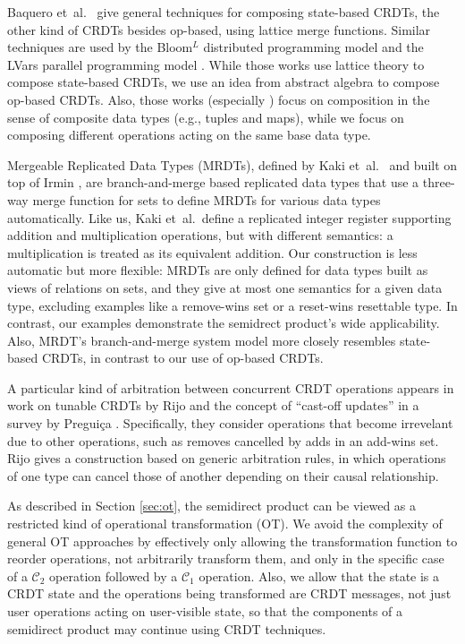 \documentclass[acmsmall,nonacm]{acmart}
\newcommand{\mc}[1]{\ensuremath{\mathcal{#1}}}
\theoremstyle{plain}
\theoremstyle{definition}
\begin{document}
Baquero et~al.\ \cite{state_based_patterns} give general techniques for composing state-based CRDTs, the other kind of CRDTs besides op-based, using lattice merge functions.  Similar techniques are used by the Bloom$\mbox{}^L$ distributed programming model \cite{bloom_lattices} and the LVars parallel programming model \cite{lvars}.  While those works use lattice theory to compose state-based CRDTs, we use an idea from abstract algebra to compose op-based CRDTs.  Also, those works (especially \cite{bloom_lattices, lvars}) focus on composition in the sense of composite data types (e.g., tuples and maps), while we focus on composing different operations acting on the same base data type.

Mergeable Replicated Data Types (MRDTs), defined by Kaki et~al.\ \cite{mrdts} and built on top of Irmin \cite{irmin}, are branch-and-merge based replicated data types that use a three-way merge function for sets to define MRDTs for various data types automatically.  Like us, Kaki et~al.\ define a replicated integer register supporting addition and multiplication operations, but with different semantics: a multiplication is treated as its equivalent addition.  Our construction is less automatic but more flexible: MRDTs are only defined for data types built as views of relations on sets, and they give at most one semantics for a given data type, excluding examples like a remove-wins set or a reset-wins resettable type.  In contrast, our examples demonstrate the semidrect product's wide applicability.  Also, MRDT's branch-and-merge system model more closely resembles state-based CRDTs, in contrast to our use of op-based CRDTs.

A particular kind of arbitration between concurrent CRDT operations appears in work on tunable CRDTs by Rijo \cite{tunable_crdts} and the concept of ``cast-off updates'' in a survey by Pregui\c{c}a \cite{crdt_overview_preguica}.  Specifically, they consider operations that become irrevelant due to other operations, such as removes cancelled by adds in an add-wins set.  Rijo gives a construction based on generic arbitration rules, in which operations of one type can cancel those of another depending on their causal relationship.  %

As described in Section \ref{sec:ot}, the semidirect product can be viewed as a restricted kind of operational transformation (OT).  We avoid the complexity of general OT approaches by effectively only allowing the transformation function to reorder operations, not arbitrarily transform them, and only in the specific case of a $\mc{C}_2$ operation followed by a $\mc{C}_1$ operation.  Also, we allow that the state is a CRDT state and the operations being transformed are CRDT messages, not just user operations acting on user-visible state, so that the components of a semidirect product may continue using CRDT techniques.
\end{document}
